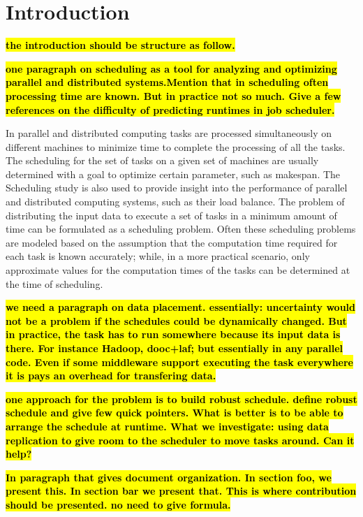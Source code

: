 \documentclass[10pt, conference, compsocconf]{IEEEtran}
\newcommand{\todo}[1]{{\color{red}\textbf{\hl{#1}}\xspace}}
\begin{document}
\IEEEpeerreviewmaketitle

\section{Introduction}

\todo{the introduction should be structure as follow.}

\todo{one paragraph on scheduling as a tool for analyzing and
  optimizing parallel and distributed systems.Mention that in
  scheduling often processing time are known. But in practice not so
  much. Give a few references on the difficulty of predicting runtimes
  in job scheduler.}
  
  In parallel and distributed computing tasks are processed simultaneously on different machines to minimize time to complete the processing of all the tasks.   The scheduling for the set of tasks on a given set of machines are usually determined with a goal to optimize certain parameter, such as makespan.  The Scheduling study is also used to provide insight into the performance of parallel and distributed computing systems, such as their load balance.  The problem of distributing the input data to execute a set of tasks in a minimum amount of time can be formulated as a scheduling problem.  Often these scheduling problems are modeled based on the assumption that the computation time required for each task is known accurately; while, in a more practical scenario, only approximate values for the computation times of the tasks can be determined at the time of scheduling.

\todo{we need a paragraph on data placement. essentially: uncertainty
  would not be a problem if the schedules could be dynamically
  changed. But in practice, the task has to run somewhere because its
  input data is there. For instance Hadoop, dooc+laf; but essentially
  in any parallel code. Even if some middleware support executing the
  task everywhere it is pays an overhead for transfering data.}

\todo{one approach for the problem is to build robust schedule. define
  robust schedule and give few quick pointers. What is better is to be
  able to arrange the schedule at runtime. What we investigate: using
  data replication to give room to the scheduler to move tasks
  around. Can it help?}

\todo{In paragraph that gives document organization. In section foo,
  we present this. In section bar we present that. This is where
  contribution should be presented. no need to give formula.}
\end{document}

